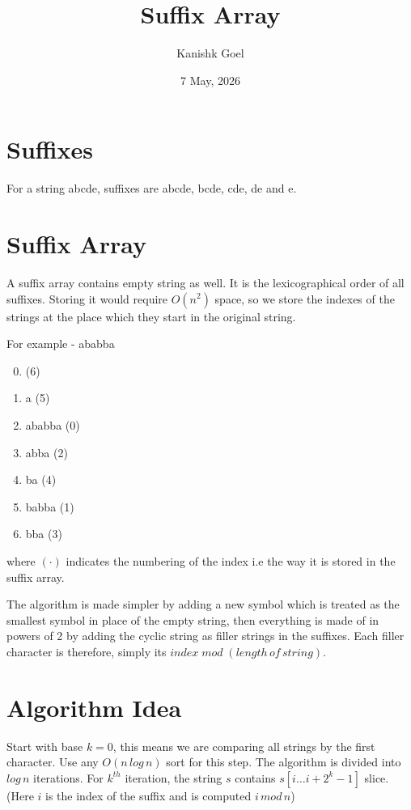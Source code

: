 \documentclass{article}
\title{Suffix Array}
\author{Kanishk Goel}
\date{7 May, 2026}
\begin{document}
	\SetAlgoCaptionSeparator{}
	\renewcommand{\thealgocf}{} 
	\renewcommand{\AlCapNameFnt}{\bfseries}
	\renewcommand{\AlCapFnt}{}
	\DontPrintSemicolon
	\renewcommand{\algorithmcfname}{}
	\maketitle
	\SetAlgoNoEnd
	
	\section{Suffixes}
	For a string abcde, suffixes are abcde, bcde, cde, de and e.
	
	\section{Suffix Array}
	A suffix array contains empty string as well. It is the lexicographical order of all suffixes.
	Storing it would require $O(n^2)$ space, so we store the indexes of the strings at the place which they start in the original string. \newline
	
	For example - ababba
	\begin{enumerate}
		\setcounter{enumi}{-1}
		\item (6)
		\item a (5)
		\item ababba (0)
		\item abba (2)
		\item ba (4)
		\item babba (1)
		\item bba (3)
	\end{enumerate}
	where $(\cdot)$ indicates the numbering of the index i.e the way it is stored in the suffix array. \newline
	
	The algorithm is made simpler by adding a new symbol which is treated as the smallest symbol in place of the empty string, then everything is made of in powers of 2 by adding the cyclic string as filler strings in the suffixes. Each filler character is therefore, simply its $index \; mod \; (length \, of \, string)$.
	
	\section{Algorithm Idea}
	Start with base $k = 0$, this means we are comparing all strings by the first character. Use any $O(n \, log \, n)$ sort for this step. The algorithm is divided into $log \, n$ iterations. For $k^{th}$ iteration, the string $s$ contains $s[i \ldots i+ 2^k - 1]$ slice. (Here $i$ is the index of the suffix and is computed $i \, mod \, n$) \newline
	
\end{document}
